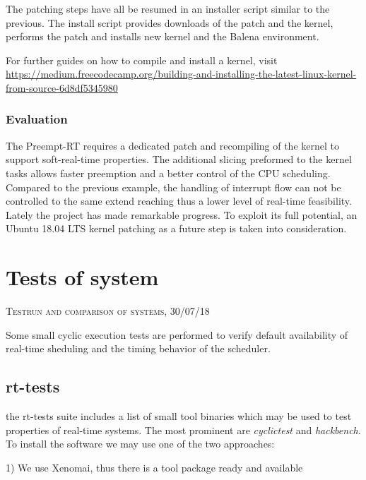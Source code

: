 \documentclass[]{scrartcl}
\begin{document}
The patching steps have all be resumed in an installer script similar to the previous. The install script provides downloads of the patch and the kernel, performs the patch and installs new kernel and the Balena environment.


For further guides on how to compile and install a kernel, visit \url{ https://medium.freecodecamp.org/building-and-installing-the-latest-linux-kernel-from-source-6d8df5345980}

\subsubsection{Evaluation}

The Preempt-RT requires a dedicated patch and recompiling of the kernel to support soft-real-time properties. The additional slicing preformed to the kernel tasks allows faster preemption and a better control of the CPU scheduling. Compared to the previous example, the handling of interrupt flow can not be controlled to the same extend reaching thus a lower level of real-time feasibility. Lately the project has made remarkable progress. To exploit its full potential, an Ubuntu 18.04 LTS kernel patching as a future step is taken into consideration.

\section{Tests of system}

{\small\textsc{Testrun and comparison of systems, 30/07/18} \bigskip}

Some small cyclic execution tests are performed to verify default availability of real-time sheduling and the timing behavior of the scheduler.

\subsection{rt-tests}

the rt-tests suite includes a list of small tool binaries which may be used to test properties of real-time systems. The most prominent are \textit{cyclictest} and \textit{hackbench}. To install the software we may use one of the two approaches:

1) We use Xenomai, thus there is a tool package ready and available
\end{document}
